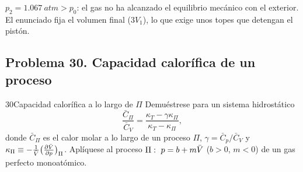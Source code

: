 \begin{observacion}
$p_2=\SI{1,067}{atm}>p_0$: el gas no ha alcanzado el equilibrio mecánico con el exterior. El enunciado fija el
volumen final ($3V_1$), lo que exige unos topes que detengan el pistón.
\end{observacion}

\subsection{Problema 30. Capacidad calorífica de un proceso}
\begin{problema}{30}{Capacidad calorífica a lo largo de $\Pi$}
Demuéstrese para un sistema hidrostático
\[
  \frac{\bar C_\Pi}{\bar C_V}=\frac{\kappa_T-\gamma\kappa_\Pi}{\kappa_T-\kappa_\Pi},
\]
donde $\bar C_\Pi$ es el calor molar a lo largo de un proceso $\Pi$, $\gamma=\bar C_p/\bar C_V$ y
$\kappa_\Pi\equiv-\frac1{\bar{V}}\bigl(\tfrac{\partial \bar{V}}{\partial p}\bigr)_{\Pi}$. Aplíquese al proceso $\Pi:\ p=b+m\bar{V}$ ($b>0$, $m<0$) de un gas
perfecto monoatómico.
\end{problema}

